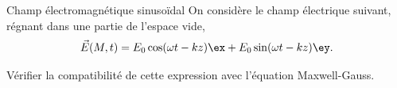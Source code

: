 \begin{exo}[PC][1][TD]{Champ électromagnétique sinusoïdal}
  On considère le champ électrique suivant, régnant dans une partie de l’espace vide,
$$
\Vec{E}(M,t) = E_0 \cos(\omega t - k z) \ex + E_0 \sin(\omega t - k z) \ey.
$$

\begin{quest}
	\item Vérifier la compatibilité de cette expression avec l'équation Maxwell-Gauss.
\end{quest}
\end{exo}
